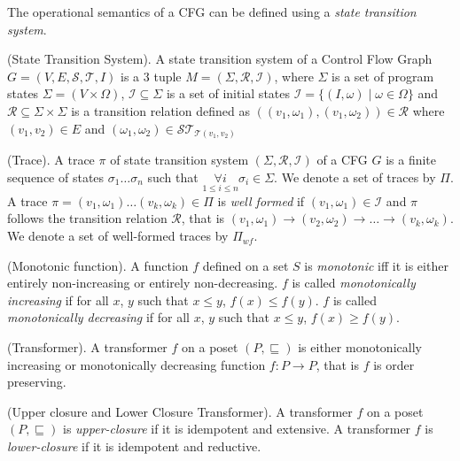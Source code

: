 %
The operational semantics of a CFG can be defined using a \emph{state 
transition system}.  
%
\begin{definition} (State Transition System). A state transition system of a 
  Control Flow Graph $G = (V, E, \mathcal{S}, \mathcal{T}, I)$ is a 3 tuple 
  $M = (\Sigma, \mathcal{R}, \mathcal{I})$, where 
  $\Sigma$ is a set of program states $\Sigma = (V \times \Omega)$,
  $\mathcal{I} \subseteq \Sigma$ 
  is a set of initial states $\mathcal{I} = \{(I, \omega) \mid \omega \in
  \Omega\}$ and $\mathcal{R} \subseteq \Sigma \times \Sigma$ 
  is a transition relation defined as 
  $((v_1, \omega_1),(v_1, \omega_2)) \in \mathcal{R}$ where $(v_1,v_2) \in E$
  and $(\omega_1, \omega_2) \in \mathcal{ST}_{\mathcal{T}(v_1,v_2)}$
\end{definition}
%
%
\begin{definition} (Trace). A trace $\pi$ of state transition system
  $(\Sigma, \mathcal{R}, \mathcal{I})$ of a CFG $G$ is a finite sequence of states
  $\sigma_1 \ldots \sigma_n$ such that $\underset{1 \leq i \leq n}{\forall i}
  \sigma_i \in \Sigma$.  We denote a set of traces by $\Pi$.  A trace $\pi=(v_1,\omega_1)
  \ldots (v_k,\omega_k) \in \Pi$ is \emph{well formed} if $(v_1,\omega_1) \in 
  \mathcal{I}$ and $\pi$ follows the transition relation $\mathcal{R}$, that is
  $(v_1,\omega_1) \rightarrow (v_2,\omega_2) \rightarrow \ldots \rightarrow 
  (v_k,\omega_k)$.  We denote a set of well-formed traces by $\Pi_{wf}$.
\end{definition}
%
\begin{definition} (Monotonic function). A function $f$ defined on a set $S$ is
  \emph{monotonic} iff it is either entirely non-increasing or entirely non-decreasing.  
  $f$ is called \emph{monotonically increasing} if for all $x$, $y$ such that $x \leq
  y$, $f(x) \leq f(y)$. 
  $f$ is called \emph{monotonically decreasing} if for all $x$, $y$ such that $x \leq
  y$, $f(x) \geq f(y)$. 
\end{definition}
%
\begin{definition} (Transformer). A transformer $f$ on a poset $(P, \sqsubseteq)$ 
is either monotonically increasing or monotonically decreasing function $f\colon
	P \rightarrow P$, that is $f$ is order preserving. 
\end{definition}
%
\begin{definition} (Upper closure and Lower Closure Transformer). A transformer $f$ on a 
poset $(P, \sqsubseteq)$ is \emph{upper-closure} if it is idempotent and extensive. A 
transformer $f$ is \emph{lower-closure} if it is idempotent and reductive.
\end{definition}
